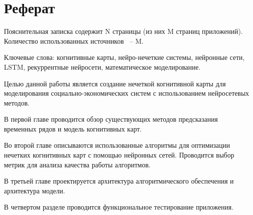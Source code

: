 \chapter*{Реферат}
\thispagestyle{plain}

Пояснительная записка содержит N страницы (из них M страниц приложений). Количество использованных источников ~-- M.

Ключевые слова: когнитивные карты, нейро-нечеткие системы,
нейронные сети, LSTM, рекуррентные нейросети, математическое моделирование.

Целью данной работы является создание нечеткой когнитивной карты для моделирования
социально-экономических систем с использованием нейросетевых методов.

В первой главе проводится обзор существующих методов предсказания временных рядов
и модель когнитивных карт.

Во второй главе описываются использованные алгоритмы для оптимизации нечетких
когнитивных карт с помощью нейронных сетей.
Проводится выбор метрик для анализа качества работы алгоритмов.

В третьей главе проектируется архитектура алгоритмического обеспечения
и архитектура модели.

В четвертом разделе проводится функциональное тестирование приложения.
